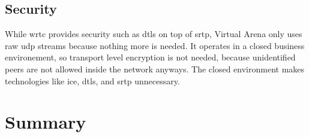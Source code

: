 \subsection{Security}
While \gls{wrtc} provides security such as \gls{dtls} on top of \gls{srtp}, Virtual Arena only uses raw \gls{udp} streams because nothing more is needed. It operates in a closed business environement, so transport level encryption is not needed, because unidentified peers are not allowed inside the network anyways.  The closed environment makes technologies like \gls{ice}, \gls{dtls}, and {srtp} unnecessary.

\section{Summary}

